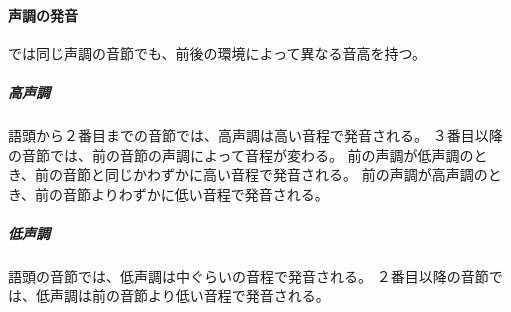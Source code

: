\paragraph{声調の発音}
\langname では同じ声調の音節でも、前後の環境によって異なる音高を持つ。

\subparagraph{高声調}
語頭から２番目までの音節では、高声調は高い音程で発音される。
３番目以降の音節では、前の音節の声調によって音程が変わる。
前の声調が低声調のとき、前の音節と同じかわずかに高い音程で発音される。
前の声調が高声調のとき、前の音節よりわずかに低い音程で発音される。

\subparagraph{低声調}
語頭の音節では、低声調は中ぐらいの音程で発音される。
２番目以降の音節では、低声調は前の音節より低い音程で発音される。
